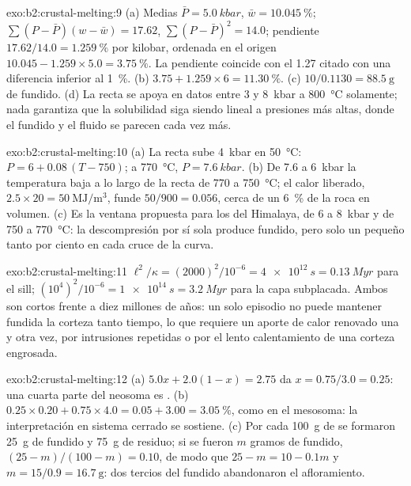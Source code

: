 \begin{solution}{exo:b2:crustal-melting:9}
(a) Medias $\bar P = \qty{5.0}{kbar}$, $\bar w = \qty{10.045}{\percent}$;
$\sum(P - \bar P)(w - \bar w) = 17.62$, $\sum(P - \bar P)^2 = 14.0$; pendiente
$17.62/14.0 = \qty{1.259}{\percent}$ por kilobar, ordenada en el origen $10.045 - 1.259\times5.0 =
\qty{3.75}{\percent}$. La pendiente coincide con el 1.27 citado con una diferencia inferior al
\qty{1}{\percent}. (b) $3.75 + 1.259\times6 = \qty{11.30}{\percent}$. (c) $10/0.1130 =
\qty{88.5}{\gram}$ de fundido. (d) La recta se apoya en datos entre 3 y \qty{8}{kbar} a
\qty{800}{\celsius} solamente; nada garantiza que la solubilidad siga siendo lineal a presiones más
altas, donde el fundido y el fluido se parecen cada vez más.
\end{solution}

\begin{solution}{exo:b2:crustal-melting:10}
(a) La recta sube \qty{4}{kbar} en \qty{50}{\celsius}: $P = 6 + 0.08\,(T - 750)$;
a \qty{770}{\celsius}, $P = \qty{7.6}{kbar}$. (b) De 7.6 a \qty{6}{kbar} la
temperatura baja a lo largo de la recta de 770 a \qty{750}{\celsius}; el calor liberado,
$2.5\times20 = \qty{50}{\mega\joule\per\cubic\metre}$, funde $50/900 = 0.056$, cerca de un
\qty{6}{\percent} de la roca en volumen. (c) Es la ventana propuesta para los
 del Himalaya, de 6 a \qty{8}{kbar} y de 750 a \qty{770}{\celsius}: la descompresión
por sí sola produce fundido, pero solo un pequeño tanto por ciento en cada cruce de la curva.
\end{solution}

\begin{solution}{exo:b2:crustal-melting:11}
$\ell^2/\kappa = (2000)^2/10^{-6} = \qty{4e12}{s} = \qty{0.13}{Myr}$ para el sill;
$(10^4)^2/10^{-6} = \qty{1e14}{s} = \qty{3.2}{Myr}$ para la capa subplacada. Ambos son cortos
frente a diez millones de años: un solo episodio no puede mantener fundida la corteza tanto tiempo, lo que requiere
un aporte de calor renovado una y otra vez, por intrusiones repetidas o por el lento calentamiento de una
corteza engrosada.
\end{solution}

\begin{solution}{exo:b2:crustal-melting:12}
(a) $5.0x + 2.0(1 - x) = 2.75$ da $x = 0.75/3.0 = 0.25$: una cuarta parte del neosoma es
. (b) $0.25\times0.20 + 0.75\times4.0 = 0.05 + 3.00 = \qty{3.05}{\percent}$, como
en el mesosoma: la interpretación en sistema cerrado se sostiene. (c) Por cada \qty{100}{\gram} de
 se formaron \qty{25}{\gram} de fundido y \qty{75}{\gram} de residuo; si se fueron $m$ gramos de
fundido, $(25 - m)/(100 - m) = 0.10$, de modo que $25 - m = 10 - 0.1m$ y $m = 15/0.9 =
\qty{16.7}{\gram}$: dos tercios del fundido abandonaron el afloramiento.
\end{solution}

